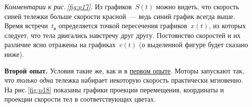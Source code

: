 \documentclass[main.tex]{subfiles}
\begin{document}

%     



\noindent\emph{Комментарии к рис.\,\ref{fig:p17}}. Из графиков~$S(t)$ можно видеть, что скорость синей тележки больше скорости красной~--- ведь синий график всегда выше. Время встречи~$t_\text{в}$ определяется точкой пересечения графиков~$x(t)$, из которых следует, что тела двигались навстречу друг другу. Постоянство скоростей и их различие ясно отражены на графиках~$v(t)$ (о выделенной фигуре будет сказано ниже).

\medskip

\noindent \textbf{Второй опыт.} Условия такие же, как и в \hyperlink{ex1}{первом опыте}. Моторы запускают так, что \emph{только одна} тележка набирает некоторую скорость практически мгновенно. На рис.\,\ref{fig:p18} показаны графики проекции перемещения, координаты и проекции скорости тел в соответствующих цветах.
\end{document}
